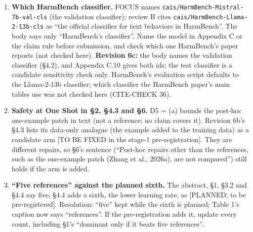 \documentclass{article}
\theoremstyle{plain}
\theoremstyle{definition}
\theoremstyle{remark}
\begin{document}
\begin{enumerate}
        the claim rule applies the classifier to answers of up to 2,048 tokens.
        FOCUS 8 Oct 10:14 UTC records the 512-token clip for the development
        check, and the stage-1 DRAFT keeps it. The brief asks to mark the length
        [TO BE FIXED in the stage-1 pre-registration]; \S{}4.2 does so neutrally
        (``clipped to 512 tokens or in full (up to 2,048)''). If the lead keeps
        the clip, the sentence can state it as design. \textbf{Revision 6c:
        resolved} by the lead's ruling 1: the clip is design (\S{}4.2; Appendix
        C.10), as HarmBench's evaluation script does.
  \item \textbf{Which HarmBench classifier.} FOCUS names
        \nolinkurl{cais/HarmBench-Mistral-7b-val-cls} (the validation
        classifier); review B cites \nolinkurl{cais/HarmBench-Llama-2-13b-cls}
        as ``the official classifier for text behaviors in HarmBench''. The body
        says only ``HarmBench's classifier''. Name the model in Appendix C or
        the claim rule before submission, and check which one HarmBench's paper
        reports (not checked here). \textbf{Revision 6c:} the body names the
        validation classifier (\S{}4.2), and Appendix C.10 gives both ids; the
        test classifier is a candidate sensitivity check only. HarmBench's
        evaluation script defaults to the Llama-2-13b classifier; which
        classifier the HarmBench paper's main tables use was not checked here
        (CITE-CHECK 36).
  \item \textbf{Safety at One Shot in \S{}2, \S{}4.3 and \S{}6.} D5 = (a) bounds
        the post-hoc one-example patch in text (not a reference; no claim covers
        it). Revision 6b's \S{}4.3 lists its data-only analogue (the example
        added to the training data) as a candidate arm [TO BE FIXED in the
        stage-1 pre-registration]. They are different repairs, so \S{}6's
        sentence (``Post-hoc repairs other than the references, such as the
        one-example patch (Zhang et al., 2026a), are not compared'') still holds
        if the arm is added.
  \item \textbf{``Five references'' against the planned sixth.} The abstract,
        \S{}1, \S{}3.2 and \S{}4.4 say five; \S{}4.4 adds a sixth, the lower
        learning rate, as [PLANNED; to be pre-registered]. Resolution: ``five''
        kept while the sixth is planned; Table 1's caption now says
        ``references''. If the pre-registration adds it, update every count,
        including \S{}1's ``dominant only if it beats five references''.

\end{enumerate}
\end{document}
